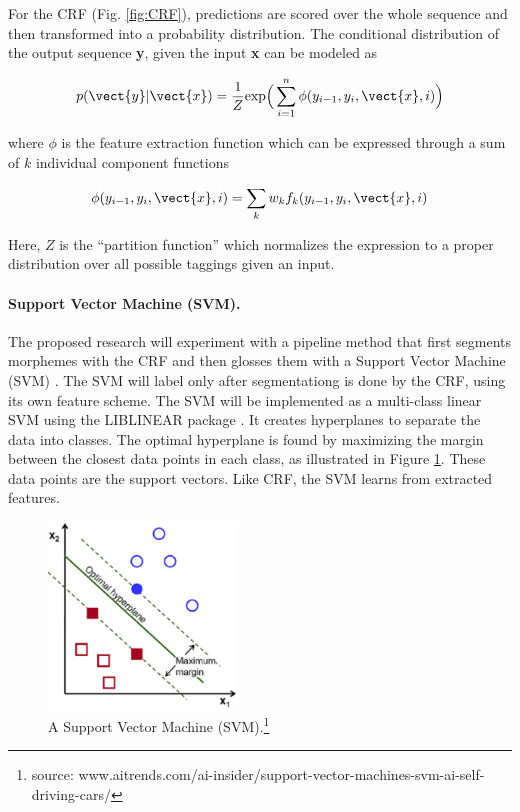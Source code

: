 For the CRF (Fig. \ref{fig:CRF}), predictions are scored over the whole sequence and then transformed into a probability distribution. The conditional distribution of the output sequence {\bf y}, given the input {\bf x} can be modeled as

\begin{equation}
p(\vect{y}|\vect{x}) = \frac{1}{Z} \textrm{exp}\Big(\sum_{i=1}^n\phi(y_{i-1}, y_i,\vect{x},i)\Big)
\end{equation}

\noindent where $\phi$ is the feature extraction function which can be expressed through a sum of $k$ individual component functions

\begin{equation}
\phi(y_{i-1}, y_i,\vect{x},i) = \sum_k w_k f_k(y_{i-1}, y_i,\vect{x},i)
\end{equation}

\noindent Here, $Z$ is the ``partition function'' which normalizes the expression to a proper distribution over all possible taggings given an input. 

\paragraph{Support Vector Machine (SVM).} The proposed research will experiment with a pipeline method that first segments morphemes with the CRF and then glosses them with a Support Vector Machine (SVM) \citep{svm_cortes}. The SVM will label only after segmentationg is done by the CRF, using its own feature scheme. The SVM will be implemented as a multi-class linear SVM using the LIBLINEAR package \citep{fan2008}. It creates hyperplanes to separate the data into classes. The optimal hyperplane is found by maximizing the margin between the closest data points in each class, as illustrated in Figure \ref{fig:SVM}. These data points are the support vectors. Like CRF, the SVM learns from extracted features.


\begin{figure}
    \centering
    \includegraphics[width=5cm]{figs/SVM1.jpg}
    \caption[Support Vector Machine]{A Support Vector Machine (SVM).\footnote{source: www.aitrends.com/ai-insider/support-vector-machines-svm-ai-self-driving-cars/}}
    \label{fig:SVM}
\end{figure}

